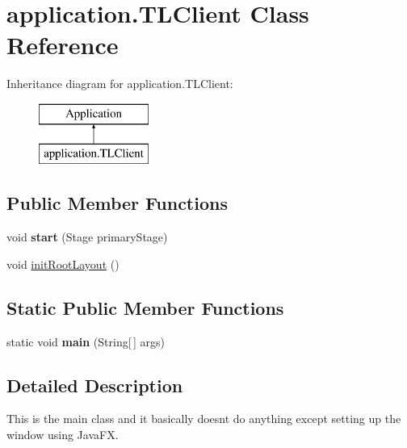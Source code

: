 \hypertarget{classapplication_1_1_t_l_client}{}\section{application.\+T\+L\+Client Class Reference}
\label{classapplication_1_1_t_l_client}
Inheritance diagram for application.\+T\+L\+Client\+:\begin{figure}[H]
\begin{center}
\leavevmode
\includegraphics[height=2.000000cm]{classapplication_1_1_t_l_client}
\end{center}
\end{figure}
\subsection*{Public Member Functions}
\begin{DoxyCompactItemize}
\item 
void {\bfseries start} (Stage primary\+Stage)\hypertarget{classapplication_1_1_t_l_client_a079567d06294cf7bc37b2e13c0441574}{}\label{classapplication_1_1_t_l_client_a079567d06294cf7bc37b2e13c0441574}

\item 
void \hyperlink{classapplication_1_1_t_l_client_a13e5e430611f2c89df8b3854843b41ba}{init\+Root\+Layout} ()
\end{DoxyCompactItemize}
\subsection*{Static Public Member Functions}
\begin{DoxyCompactItemize}
\item 
static void {\bfseries main} (String\mbox{[}$\,$\mbox{]} args)\hypertarget{classapplication_1_1_t_l_client_a2b602e35c6c33e4195f031187f90253c}{}\label{classapplication_1_1_t_l_client_a2b602e35c6c33e4195f031187f90253c}

\end{DoxyCompactItemize}


\subsection{Detailed Description}
This is the main class and it basically doesn\textquotesingle{}t do anything except setting up the window using Java\+FX.

